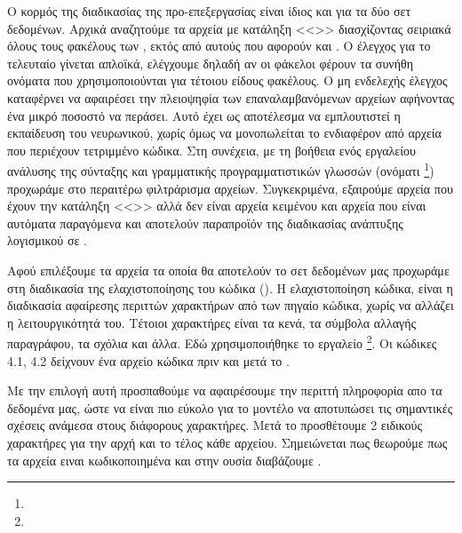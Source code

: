 Ο κορμός της διαδικασίας της προ-επεξεργασίας είναι ίδιος και για τα δύο σετ δεδομένων. 
Αρχικά αναζητούμε τα αρχεία με κατάληξη <<>> διασχίζοντας σειριακά όλους τους φακέλους των , εκτός από αυτούς που αφορούν  και .
Ο έλεγχος για το τελευταίο γίνεται απλοϊκά, ελέγχουμε δηλαδή αν οι φάκελοι φέρουν τα συνήθη ονόματα που χρησιμοποιούνται για τέτοιου είδους φακέλους.
Ο μη ενδελεχής έλεγχος καταφέρνει να αφαιρέσει την πλειοψηφία των επαναλαμβανόμενων αρχείων αφήνοντας ένα μικρό ποσοστό να περάσει.
Αυτό έχει ως αποτέλεσμα να εμπλουτιστεί η εκπαίδευση του νευρωνικού, χωρίς όμως να μονοπωλείται το ενδιαφέρον από αρχεία που περιέχουν τετριμμένο κώδικα.
Στη συνέχεια, με τη βοήθεια ενός εργαλείου ανάλυσης της σύνταξης και γραμματικής προγραμματιστικών γλωσσών (ονόματι \footnote{}) προχωράμε στο περαιτέρω φιλτράρισμα αρχείων.
Συγκεκριμένα, εξαιρούμε αρχεία που έχουν την κατάληξη <<>> αλλά δεν είναι αρχεία κειμένου και αρχεία που είναι αυτόματα παραγόμενα και αποτελούν παραπροϊόν της διαδικασίας ανάπτυξης λογισμικού σε .





Αφού επιλέξουμε τα αρχεία τα οποία θα αποτελούν το σετ δεδομένων μας προχωράμε στη διαδικασία της ελαχιστοποίησης του κώδικα ().
Η ελαχιστοποίηση κώδικα, είναι η διαδικασία αφαίρεσης περιττών χαρακτήρων από των πηγαίο κώδικα, χωρίς να αλλάζει η λειτουργικότητά του. Τέτοιοι χαρακτήρες είναι τα κενά, τα σύμβολα αλλαγής παραγράφου, τα σχόλια και άλλα. Εδώ χρησιμοποιήθηκε το εργαλείο \footnote{}. Οι κώδικες 4.1, 4.2 δείχνουν ένα αρχείο κώδικα πριν και μετά το .

Με την επιλογή αυτή προσπαθούμε να αφαιρέσουμε την περιττή πληροφορία απο τα δεδομένα μας, ώστε να είναι πιο εύκολο για το μοντέλο να αποτυπώσει τις σημαντικές σχέσεις ανάμεσα στους διάφορους χαρακτήρες.
Μετά το  προσθέτουμε 2 ειδικούς χαρακτήρες για την αρχή και το τέλος κάθε αρχείου. Σημειώνεται πως θεωρούμε πως τα αρχεία ειναι  κωδικοποιημένα και στην ουσία διαβάζουμε .


